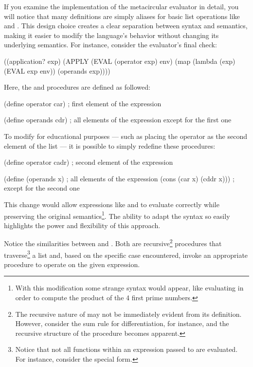   If you examine the implementation of the metacircular evaluator in detail, you will notice that many definitions are simply aliases for basic list operations like  and . This design choice creates a clear separation between syntax and semantics, making it easier to modify the language's behavior without changing its underlying semantics. For instance, consider the evaluator's final check:

  \begin{code}
((application? exp) (APPLY (EVAL (operator exp) env)
                           (map (lambda (exp) (EVAL exp env))
                                (operands exp))))
  \end{code}

  Here, the  and  procedures are defined as followed:

  \begin{code}
(define operator car)  ; first element of the expression

(define operands cdr)  ; all elements of the expression except for the first one
  \end{code}

  To modify  for educational purposes --- such as placing the operator as the second element of the list --- it is possible to simply redefine these procedures:
  \begin{code}
(define operator cadr)      ; second element of the expression

(define (operands x)        ; all elements of the expression
  (cons (car x) (cddr x)))  ; except for the second one
  \end{code}

  This change would allow expressions like  and  to evaluate correctly while preserving the original semantics\footnote{With this modification some strange syntax would appear, like evaluating  in order to compute the product of the 4 first prime numbers.}. The ability to adapt the syntax so easily highlights the power and flexibility of this approach.

  Notice the similarities between  and . Both are recursive\footnote{The recursive nature of  may not be immediately evident from its definition. However, consider the sum rule for differentiation, for instance, and the recursive structure of the procedure becomes apparent.} procedures that traverse\footnote{Notice that not all functions within an expression passed to  are evaluated. For instance, consider the  special form.} a  list and, based on the specific case encountered, invoke an appropriate procedure to operate on the given expression.


